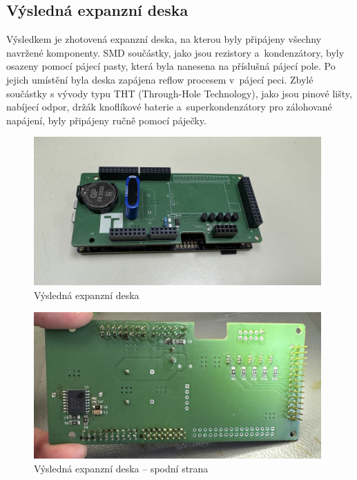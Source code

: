 \subsection{Výsledná expanzní deska}
\label{vysledek}
Výsledkem je zhotovená expanzní deska, na kterou byly připájeny všechny navržené komponenty. SMD součástky, jako jsou rezistory a~kondenzátory, byly osazeny pomocí pájecí pasty, která byla nanesena na příslušná pájecí pole. Po jejich umístění byla deska zapájena reflow procesem v~pájecí peci. Zbylé součástky s vývody typu THT (Through-Hole Technology), jako jsou pinové lišty, nabíjecí odpor, držák knoflíkové baterie a~superkondenzátory pro zálohované napájení, byly připájeny ručně pomocí páječky.

\begin{figure}[h]
    \centering
    \includegraphics[width=0.98\textwidth]{obrazky-figures/datalogger.jpg}
    
    \caption{Výsledná expanzní deska}
    \label{fig:expansion-board}
\end{figure}

\begin{figure}[h]
    \centering
    \includegraphics[width=0.98\textwidth]{obrazky-figures/expansion-shield-back.jpg}
    
    \caption{Výsledná expanzní deska -- spodní strana}
    \label{fig:expansion-board-back}
\end{figure}

